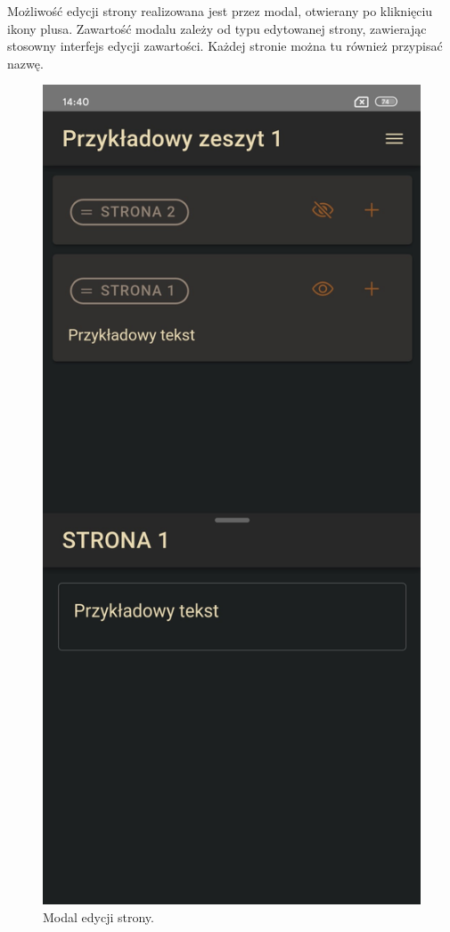 Możliwość edycji strony realizowana jest przez modal, otwierany po kliknięciu ikony plusa. Zawartość modalu zależy od
typu edytowanej strony, zawierając stosowny interfejs edycji zawartości. Każdej stronie można tu również przypisać nazwę.
\begin{figure}[H]
	\begin{center}
		\includegraphics[scale=0.2]{media/EditorModal.jpg}
	\end{center}
	\caption{Modal edycji strony.}
	\label{rys:editor-modal}
\end{figure}


